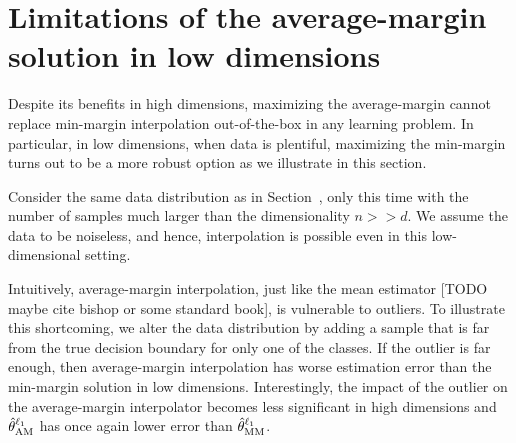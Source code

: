 \section{Limitations of the average-margin solution in low dimensions}

Despite its benefits in high dimensions, maximizing the average-margin cannot
replace min-margin interpolation out-of-the-box in any learning problem. In
particular, in low dimensions, when data is plentiful, maximizing the min-margin
turns out to be a more robust option as we illustrate in this section.

Consider the same data distribution as in Section~, only this time with
the number of samples much larger than the dimensionality $n >> d$. We assume
the data to be noiseless, and hence, interpolation is possible even in this
low-dimensional setting.

Intuitively, average-margin interpolation, just like the mean estimator [TODO
maybe cite bishop or some standard book], is vulnerable to outliers.  To
illustrate this shortcoming, we alter the data distribution by adding a sample
that is far from the true decision boundary for only one of the classes.
If the outlier is far enough, then average-margin interpolation has worse
estimation error than the min-margin solution in low dimensions. Interestingly,
the impact of the outlier on the average-margin interpolator becomes less
significant in high dimensions and $\hat{\theta}^{\ell_1}_{\mathrm{AM}}$ has once again lower error than $\hat{\theta}^{\ell_1}_{\mathrm{MM}}$.


